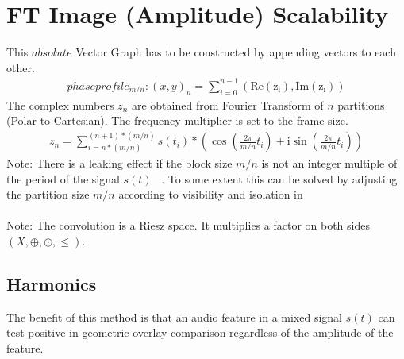 \documentclass{report}
\begin{document}
\section{FT Image (Amplitude) Scalability}
This $absolute$ Vector Graph has to be constructed by appending vectors to each other.
\begin{align}
phaseprofile_{m/n}: (x,y)_{n}=\sum \limits _{i=0}^{n-1}(\mathrm{Re(z_{i})},\mathrm{Im(z_{i})})
\end{align}
The complex numbers $z_{n}$ are obtained from Fourier Transform of $n$ partitions (Polar to Cartesian). The frequency multiplier is set to the frame size.
\begin{align}
z_{n}= \sum \limits _{i=n*(m/n)}^{(n+1)*(m/n)} s(t_{i})*(\cos(\frac{2\pi}{m/n}t_{i})+\mathrm{i}\sin(\frac{2\pi}{m/n}t_{i}))\label{eq:3}
\end{align}
Note: There is a leaking effect if the block size $m/n$ is not an integer multiple of the period of the signal $s(t)$ ~\cite[Fensterfunktion]{Fensterfunktion}. To some extent this can be solved by adjusting the partition size $m/n$ according to visibility and isolation in ~\cite[Stopeight\_Comparator.tex]{Comparator}\\\\
Note: The convolution is a Riesz space. It multiplies a factor on both sides $(X,\oplus,\odot,\leq)$.
\subsection{Harmonics}
The benefit of this method is that an audio feature in a mixed signal $s(t)$ can test positive in geometric overlay comparison regardless of the amplitude of the feature.

\iffalse
\printbibliography
\fi
{}

\end{document}
